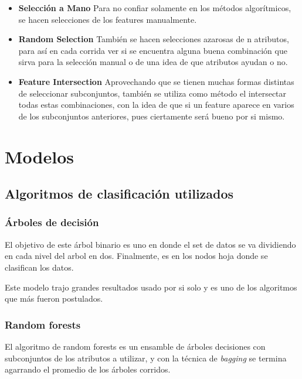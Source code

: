 \documentclass[a4paper]{article}
\begin{document}
\begin {itemize}
\begin{itemize}
	\item \textbf{Selección a Mano} Para no confiar solamente en los métodos algorítmicos, se hacen selecciones de los features manualmente.

	\item \textbf{Random Selection} También se hacen selecciones azarosas de n atributos, para así en cada corrida ver si se encuentra alguna buena combinación que sirva para la selección manual o de una idea de que atributos ayudan o no.

	\item \textbf{Feature Intersection} Aprovechando que se tienen muchas formas distintas de seleccionar subconjuntos, también se utiliza como método el intersectar todas estas combinaciones, con la idea de que si un feature aparece en varios de los subconjuntos anteriores, pues ciertamente será bueno por si mismo.

\end{itemize}														

\end {itemize}


\section{Modelos}

\subsection{Algoritmos de clasificación utilizados}

\subsubsection{Árboles de decisión}

El objetivo de este árbol binario es uno en donde el set de datos se va dividiendo en cada nivel del arbol en dos. Finalmente, es en los nodos hoja donde se clasifican los datos.

Este modelo trajo grandes resultados usado por si solo y es uno de los algoritmos que más fueron postulados.

\subsubsection{Random forests}

El algoritmo de random forests es un ensamble de árboles decisiones con subconjuntos de los atributos a utilizar, y con la técnica de \textit{bagging} se termina agarrando el promedio de los árboles corridos.
\end{document}
